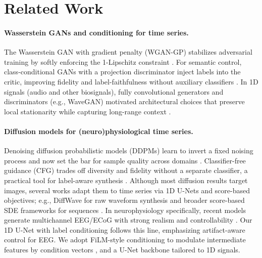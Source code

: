 \documentclass{article}
\begin{document}

\section{Related Work}

\paragraph{Wasserstein GANs and conditioning for time series.}
The Wasserstein GAN with gradient penalty (WGAN-GP) stabilizes adversarial training by softly enforcing the 1-Lipschitz constraint \citep{gulrajani2017wgan}. For semantic control, class-conditional GANs with a projection discriminator inject labels into the critic, improving fidelity and label-faithfulness without auxiliary classifiers \citep{miyato2018cgan}. In 1D signals (audio and other biosignals), fully convolutional generators and discriminators (e.g., WaveGAN) motivated architectural choices that preserve local stationarity while capturing long-range context \citep{donahue2019adversarialaudio}. 

\paragraph{Diffusion models for (neuro)physiological time series.}
Denoising diffusion probabilistic models (DDPMs) learn to invert a fixed noising process and now set the bar for sample quality across domains \citep{ho2020denoisingprobabilistic,nichol2021improveddenoising,dhariwal2021beatgans}. Classifier-free guidance (CFG) trades off diversity and fidelity without a separate classifier, a practical tool for label-aware synthesis \citep{ho2022classifierfree}. Although most diffusion results target images, several works adapt them to time series via 1D U-Nets and score-based objectives; e.g., DiffWave for raw waveform synthesis and broader score-based SDE frameworks for sequences \citep{kong2020diffwaveversatile,song2020denoisingimplicit}. In neurophysiology specifically, recent models generate multichannel EEG/ECoG with strong realism and controllability \citep{vetter2024generatingrealistic,tosato2023eegsynthetic}. Our 1D U-Net with label conditioning follows this line, emphasizing artifact-aware control for EEG. We adopt FiLM-style conditioning to modulate intermediate features by condition vectors \citep{perez2018filmvisual}, and a U-Net backbone \citep{ronneberger2015unet} tailored to 1D signals.
\end{document}
